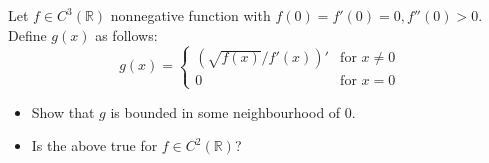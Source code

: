Let \(f\in C^3(\mathbb{R})\) nonnegative function with \(f(0)=f'(0)=0, f''(0)>0\). Define \(g(x)\) as follows:
\[ g(x)= \begin{cases} \left( \sqrt{f(x)}/f'(x) \right)' &\text{for } x\neq 0 \\ 0 &\text{for } x=0 \end{cases} \]
\begin{itemize}
\item[(a)] Show that \(g\) is bounded in some neighbourhood of \(0\).
\item[(b)] Is the above true for \(f\in C^2(\mathbb{R})\)?
\end{itemize}
